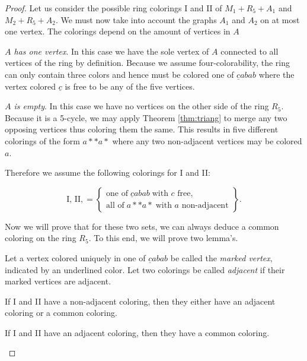 \begin{proof}Let us consider the possible ring colorings I and II of $M_1 + R_5 + A_1$ and $M_2 + R_5 + A_2$. We must now take into account the graphs $A_1$ and $A_2$ on at most one vertex. The colorings depend on the amount of vertices in $A$

\emph{$A$ has one vertex}. In this case we have the sole vertex of $A$ connected to all vertices of the ring by definition. Because we assume four-colorability, the ring can only contain three colors and hence must be colored one of $\underline{c}abab$ where the vertex colored $\underline{c}$ is free to be any of the five vertices.

\emph{$A$ is empty}. In this case we have no vertices on the other side of the ring $R_5$. Because it is a 5-cycle, we may apply Theorem \ref{thm:triang} to merge any two opposing vertices thus coloring them the same. This results in five different colorings of the form $a{*}{*}a{*}$ where any two non-adjacent vertices may be colored $a$.

Therefore we assume the following colorings for I and II:

\begin{equation}
    \text{I, II}, = \left\{ \begin{matrix}
        \text{one of}\;\underline{c}abab \; \text{with $c$ free}, \\
        \text{all of}\;a{*}{*}a{*} \; \text{with $a$  non-adjacent}
    \end{matrix}\right\}.
\end{equation}

Now we will prove that for these two sets, we can always deduce a common coloring on the ring $R_5$. To this end, we will prove two lemma's.

Let a vertex colored uniquely in one of $\underline{c}abab$ be called the \emph{marked vertex}, indicated by an underlined color. Let two colorings be called \emph{adjacent} if their marked vertices are adjacent.

\begin{lemma}
    \label{lem:r5_first}
    If I and II have a non-adjacent coloring, then they either have an adjacent coloring or a common coloring.
\end{lemma}

\begin{lemma}
    \label{lem:r5_second}
    If I and II have an adjacent coloring, then they have a common coloring.
\end{lemma}


\end{proof}
